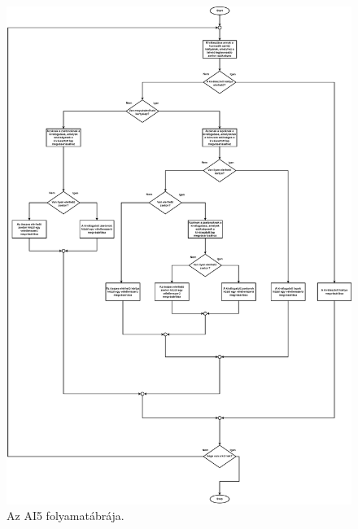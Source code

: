 \begin{figure}[h]
\centering
\includegraphics[scale=0.2]{images/fifthAI_flowchart.png}
\caption{Az AI5 folyamatábrája.}
\label{fig:AI5_flowchart}
\end{figure}